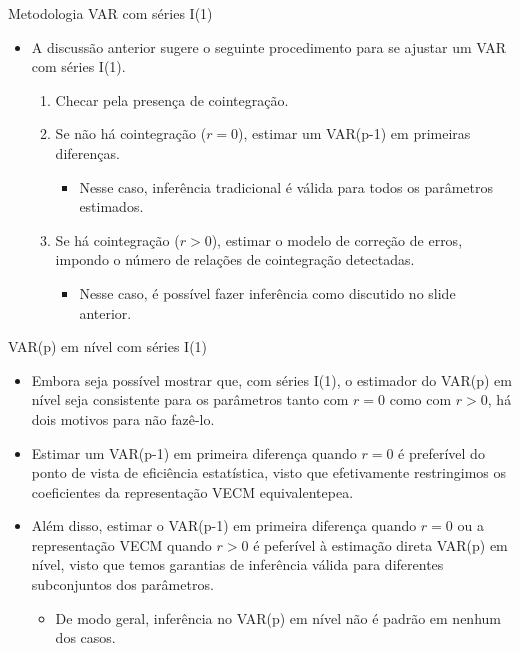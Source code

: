 \documentclass[11pt]{beamer}
\begin{document}
\begin{frame}{Metodologia VAR com séries I(1)}
\begin{itemize}
	\item A discussão anterior sugere o seguinte procedimento para se ajustar um VAR com séries I(1).
	\begin{enumerate}
		\item Checar pela presença de cointegração. 
		\item Se não há cointegração ($r=0$), estimar um VAR(p-1) em primeiras diferenças.
		\begin{itemize}
			\item Nesse caso, inferência tradicional é válida para todos os parâmetros estimados.
		\end{itemize}
		\item Se há cointegração ($r>0$), estimar o modelo de correção de erros, impondo o número de relações de cointegração detectadas.
		\begin{itemize}
			\item Nesse caso, é possível fazer inferência como discutido no slide anterior.
		\end{itemize}
	\end{enumerate}

\end{itemize}
\end{frame}
\begin{frame}{VAR(p) em nível com séries I(1)}
\begin{itemize}
	\item Embora seja possível mostrar que, com séries I(1), o estimador do VAR(p) em nível seja consistente para os parâmetros tanto com $r=0$ como com $r>0$, há dois motivos para não fazê-lo.
	\item Estimar um VAR(p-1) em primeira diferença quando $r=0$ é preferível do ponto de vista de eficiência estatística, visto que efetivamente restringimos os coeficientes da representação VECM equivalentepea.
\item Além disso, estimar o VAR(p-1) em primeira diferença quando $r=0$ ou a representação VECM quando $r>0$ é peferível à estimação direta VAR(p) em nível, visto que temos garantias de inferência válida para diferentes subconjuntos dos parâmetros.
\begin{itemize}
	\item De modo geral, inferência no VAR(p) em nível não é padrão em nenhum dos casos.
\end{itemize}

\end{itemize}
\end{frame}
\end{document}
